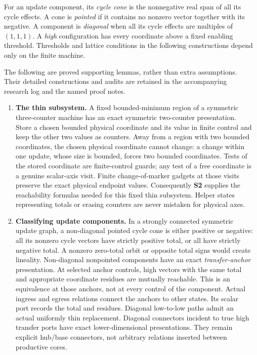 \documentclass[11pt,a4paper]{article}
\theoremstyle{remark}
\begin{document}
For an update component, its \emph{cycle cone} is the nonnegative real
span of all its cycle effects. A cone is \emph{pointed} if it contains
no nonzero vector together with its negative. A component is
\emph{diagonal} when all its cycle effects are multiples of
\((1,1,1)\). A \emph{high} configuration has every coordinate above a
fixed enabling threshold. Thresholds and lattice conditions in the
following constructions depend only on the finite machine.

The following are proved supporting lemmas, rather than extra assumptions. Their detailed constructions and audits are retained in the accompanying research log and the named proof notes.

\begin{enumerate}[label=\textup{(\alph*)},leftmargin=*]

\item\label{item:ingredient-a} \textbf{The thin subsystem.} A fixed bounded-minimum region of a symmetric three-counter machine has an exact symmetric two-counter presentation. Store a chosen bounded physical coordinate and its value in finite control and keep the other two values as counters. Away from a region with two bounded coordinates, the chosen physical coordinate cannot change: a change within one update, whose size is bounded, forces two bounded coordinates. Tests of the stored coordinate are finite-control guards; any test of a free coordinate is a genuine scalar-axis visit. Finite change-of-marker gadgets at those visits preserve the exact physical endpoint values. Consequently \textbf{S2} supplies the reachability formulas needed for this fixed thin subsystem. Helper states representing totals or erasing counters are never mistaken for physical axes.

\item\label{item:ingredient-b} \textbf{Classifying update components.} In a strongly connected symmetric update graph, a non-diagonal pointed cycle cone is either positive or negative: all its nonzero cycle vectors have strictly positive total, or all have strictly negative total. A nonzero zero-total orbit or opposite total signs would create lineality. Non-diagonal nonpointed components have an exact
\emph{transfer-anchor} presentation. At selected anchor controls,
high vectors with the same total and appropriate coordinate residues
are mutually reachable. This is an equivalence at those anchors, not
at every control of the component. Actual ingress and egress relations
connect the anchors to other states. Its scalar port records the total
and residues. Diagonal low-to-low paths admit an actual uniformly thin replacement. Diagonal connectors incident to true high transfer ports have exact lower-dimensional presentations. They remain explicit hub/base connectors, not arbitrary relations inserted between productive cores.


\end{enumerate}
\end{document}
